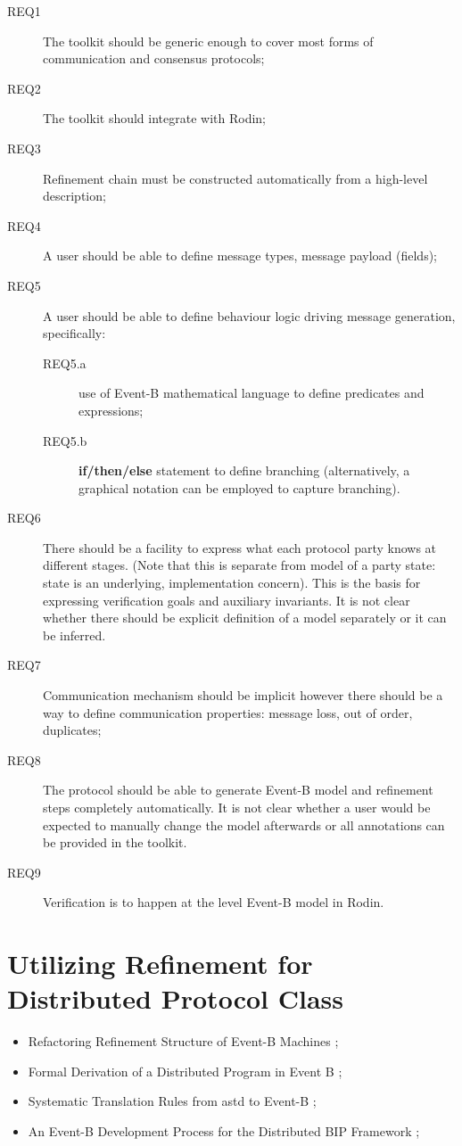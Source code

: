 \documentclass{llncs}
\begin{document}
		\begin{description}
			\item[REQ1] The toolkit should be generic enough to cover most forms of communication and consensus protocols;
			\item[REQ2] The toolkit should integrate with Rodin;
			\item[REQ3] Refinement chain must be constructed automatically from a high-level description;
			\item[REQ4] A user should be able to define message types, message payload (fields);
			\item[REQ5] A user should be able to define behaviour logic driving message generation, specifically: 
			\begin{description}
				\item[REQ5.a] use of Event-B mathematical language to define predicates and expressions;
				\item[REQ5.b] \textbf{if/then/else} statement to define branching (alternatively, a graphical notation can be employed to capture branching).
			\end{description}
			\item[REQ6] There should be a facility to express what each protocol party knows at different stages. (Note that this is separate from model of a party state: state is an underlying, implementation concern). This is the basis for expressing verification goals and auxiliary invariants. It is not clear whether there should be explicit definition of a model separately or it can be inferred.
			\item[REQ7] Communication mechanism should be implicit however there should be a way to define communication properties: message loss, out of order, duplicates;
			\item[REQ8] The protocol should be able to generate Event-B model and refinement steps completely automatically. It is not clear whether a user would be expected to manually change the model afterwards or all annotations can be provided in the toolkit.
			\item[REQ9] Verification is to happen at the level Event-B model in Rodin.
		\end{description}
	\section{Utilizing Refinement for Distributed Protocol Class}
	\begin{itemize}

		\item Refactoring Refinement Structure of Event-B Machines \cite{refactoring};
		\item Formal Derivation of a Distributed Program in Event B \cite{alexei_distributed}; 
		\item Systematic Translation Rules from astd to Event-B \cite{astd2eb};
		\item An Event-B Development Process for the Distributed BIP Framework \cite{bip2eb};

	\end{itemize}
\end{document}
